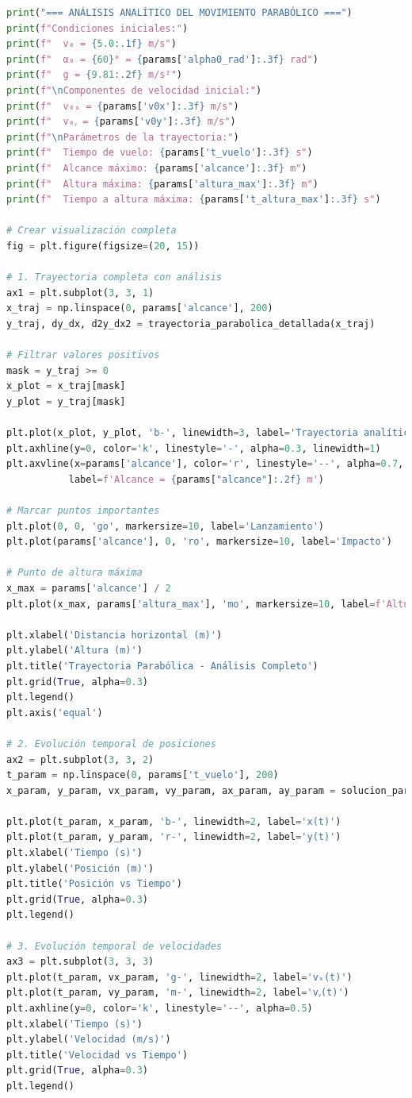 \documentclass{article}
\begin{document}
\begin{lstlisting}[language=Python, caption={Análisis completo del movimiento parabólico}]
print("=== ANÁLISIS ANALÍTICO DEL MOVIMIENTO PARABÓLICO ===")
print(f"Condiciones iniciales:")
print(f"  v₀ = {5.0:.1f} m/s")
print(f"  α₀ = {60}° = {params['alpha0_rad']:.3f} rad")
print(f"  g = {9.81:.2f} m/s²")
print(f"\nComponentes de velocidad inicial:")
print(f"  v₀ₓ = {params['v0x']:.3f} m/s")
print(f"  v₀ᵧ = {params['v0y']:.3f} m/s")
print(f"\nParámetros de la trayectoria:")
print(f"  Tiempo de vuelo: {params['t_vuelo']:.3f} s")
print(f"  Alcance máximo: {params['alcance']:.3f} m")
print(f"  Altura máxima: {params['altura_max']:.3f} m")
print(f"  Tiempo a altura máxima: {params['t_altura_max']:.3f} s")

# Crear visualización completa
fig = plt.figure(figsize=(20, 15))

# 1. Trayectoria completa con análisis
ax1 = plt.subplot(3, 3, 1)
x_traj = np.linspace(0, params['alcance'], 200)
y_traj, dy_dx, d2y_dx2 = trayectoria_parabolica_detallada(x_traj)

# Filtrar valores positivos
mask = y_traj >= 0
x_plot = x_traj[mask]
y_plot = y_traj[mask]

plt.plot(x_plot, y_plot, 'b-', linewidth=3, label='Trayectoria analítica')
plt.axhline(y=0, color='k', linestyle='-', alpha=0.3, linewidth=1)
plt.axvline(x=params['alcance'], color='r', linestyle='--', alpha=0.7, 
           label=f'Alcance = {params["alcance"]:.2f} m')

# Marcar puntos importantes
plt.plot(0, 0, 'go', markersize=10, label='Lanzamiento')
plt.plot(params['alcance'], 0, 'ro', markersize=10, label='Impacto')

# Punto de altura máxima
x_max = params['alcance'] / 2
plt.plot(x_max, params['altura_max'], 'mo', markersize=10, label=f'Altura máx = {params["altura_max"]:.2f} m')

plt.xlabel('Distancia horizontal (m)')
plt.ylabel('Altura (m)')
plt.title('Trayectoria Parabólica - Análisis Completo')
plt.grid(True, alpha=0.3)
plt.legend()
plt.axis('equal')

# 2. Evolución temporal de posiciones
ax2 = plt.subplot(3, 3, 2)
t_param = np.linspace(0, params['t_vuelo'], 200)
x_param, y_param, vx_param, vy_param, ax_param, ay_param = solucion_parametrica_exacta(t_param)

plt.plot(t_param, x_param, 'b-', linewidth=2, label='x(t)')
plt.plot(t_param, y_param, 'r-', linewidth=2, label='y(t)')
plt.xlabel('Tiempo (s)')
plt.ylabel('Posición (m)')
plt.title('Posición vs Tiempo')
plt.grid(True, alpha=0.3)
plt.legend()

# 3. Evolución temporal de velocidades
ax3 = plt.subplot(3, 3, 3)
plt.plot(t_param, vx_param, 'g-', linewidth=2, label='vₓ(t)')
plt.plot(t_param, vy_param, 'm-', linewidth=2, label='vᵧ(t)')
plt.axhline(y=0, color='k', linestyle='--', alpha=0.5)
plt.xlabel('Tiempo (s)')
plt.ylabel('Velocidad (m/s)')
plt.title('Velocidad vs Tiempo')
plt.grid(True, alpha=0.3)
plt.legend()


\end{lstlisting}
\end{document}
